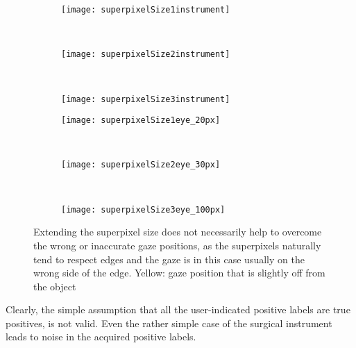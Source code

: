 \begin{figure}[ht]
	\centering
	\begin{subfigure}[h]{0.31\textwidth}
	      \texttt{[image: superpixelSize1instrument]}
	\end{subfigure}
	~
	\begin{subfigure}[h]{0.31\textwidth}
		\texttt{[image: superpixelSize2instrument]}	
	\end{subfigure}
	~
	\begin{subfigure}[h]{0.31\textwidth}
		\texttt{[image: superpixelSize3instrument]}	
	\end{subfigure}	
	
	\vspace{3mm}
	\begin{subfigure}[h]{0.31\textwidth}
	      \texttt{[image: superpixelSize1eye\_20px]}
	\end{subfigure}
	~
	\begin{subfigure}[h]{0.31\textwidth}
		\texttt{[image: superpixelSize2eye\_30px]}	
	\end{subfigure}
	~
	\begin{subfigure}[h]{0.31\textwidth}
		\texttt{[image: superpixelSize3eye\_100px]}	
	\end{subfigure}	
	\caption{Extending the superpixel size does not necessarily help to overcome the wrong or inaccurate gaze positions, as the superpixels naturally tend to respect edges and the gaze is in this case usually on the wrong side of the edge. Yellow: gaze position that is slightly off from the object}
	\label{fig:gazeOffSuperpixelSize}
\end{figure}

Clearly, the simple assumption that all the user-indicated positive labels are true positives, is not valid. Even the rather simple case of the surgical instrument leads to noise in the acquired positive labels.
